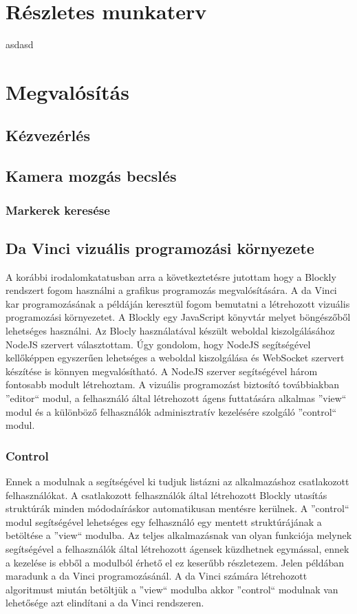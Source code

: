 \documentclass[12pt,a4paper,oneside]{report} %
\begin{document}
\chapter{Részletes munkaterv}
asdasd
\begin{figure}[H]
\end{figure}
\chapter{Megvalósítás}
\section{Kézvezérlés}
\label{kezvez}
\section{Kamera mozgás becslés}
\subsection{Markerek keresése}

\section{Da Vinci vizuális programozási környezete}
A korábbi irodalomkatatusban arra a következtetésre jutottam hogy a Blockly rendszert fogom használni a  grafikus programozás megvalósítására.
A da Vinci kar programozásának a példáján keresztül fogom bemutatni a létrehozott vizuális programozási környezetet.
A Blockly egy JavaScript könyvtár melyet böngészőből lehetséges használni. Az Blocly használatával készült weboldal kiszolgálásához NodeJS szervert választottam. Úgy gondolom, hogy NodeJS segítségével kellőképpen egyszerűen lehetséges a weboldal kiszolgálása és WebSocket szervert készítése is könnyen megvalósítható. A NodeJS szerver segítségével három fontosabb modult létrehoztam. A vizuális programozást biztosító továbbiakban ''editor`` modul, a felhasználó által létrehozott ágens futtatására alkalmas ''view`` modul és a különböző felhasználók adminisztratív kezelésére szolgáló ''control`` modul.
\subsection{Control}
Ennek a modulnak a segítségével ki tudjuk listázni az alkalmazáshoz csatlakozott felhasználókat. A csatlakozott felhasználók által létrehozott Blockly utasítás struktúrák minden módodaíráskor automatikusan mentésre kerülnek. A ''control`` modul segítségével lehetséges egy felhasználó egy mentett struktúrájának a betöltése a  ''view`` modulba. Az teljes alkalmazásnak van olyan funkciója melynek segítségével a felhasználók által létrehozott ágensek küzdhetnek egymással, ennek a kezelése is ebből a modulból érhető el ez keserűbb részletezem. Jelen példában maradunk a da Vinci programozásánál. A da Vinci számára létrehozott algoritmust miután betöltjük a ''view`` modulba akkor ''control`` modulnak van lehetősége azt elindítani a da Vinci rendszeren. 
\end{document}

